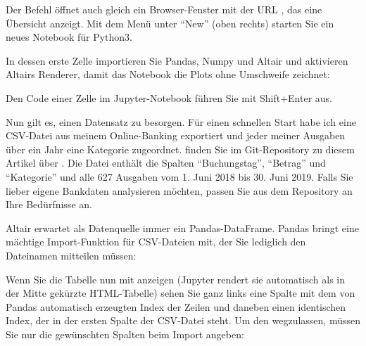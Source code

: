\medskip



\medskip


Der Befehl öffnet auch gleich ein Browser-Fenster mit der URL , das eine Übersicht anzeigt. Mit dem Menü unter ``New'' (oben rechts) starten Sie ein neues Notebook für Python3.

In dessen erste Zelle importieren Sie Pandas, Numpy und Altair und aktivieren Altairs Renderer, damit das Notebook die Plots ohne Umschweife zeichnet:

\medskip





\medskip


Den Code einer Zelle im Jupyter-Notebook führen Sie mit Shift+Enter aus.

Nun gilt es, einen Datensatz zu besorgen. Für einen schnellen Start habe ich eine CSV-Datei aus meinem Online-Banking exportiert und jeder meiner Ausgaben über ein Jahr eine Kategorie zugeordnet.   finden Sie im Git-Repository zu diesem Artikel über . Die Datei enthält die Spalten ``Buchungstag'', ``Betrag'' und ``Kategorie'' und alle 627 Ausgaben vom 1. Juni 2018 bis 30. Juni 2019. Falls Sie lieber eigene Bankdaten analysieren möchten, passen Sie  aus dem Repository an Ihre Bedürfnisse an.

Altair erwartet als Datenquelle immer ein Pandas-DataFrame. Pandas bringt eine mächtige Import-Funktion für CSV-Dateien mit, der Sie lediglich den Dateinamen mitteilen müssen:

\medskip


\medskip

Wenn Sie die Tabelle nun mit  anzeigen (Jupyter rendert sie automatisch als in der Mitte gekürzte HTML-Tabelle) sehen Sie ganz links eine Spalte mit dem von Pandas automatisch erzeugten Index der Zeilen und daneben einen identischen Index, der in der ersten Spalte der CSV-Datei steht. Um den wegzulassen, müssen Sie nur die gewünschten Spalten beim Import angeben:

\medskip



